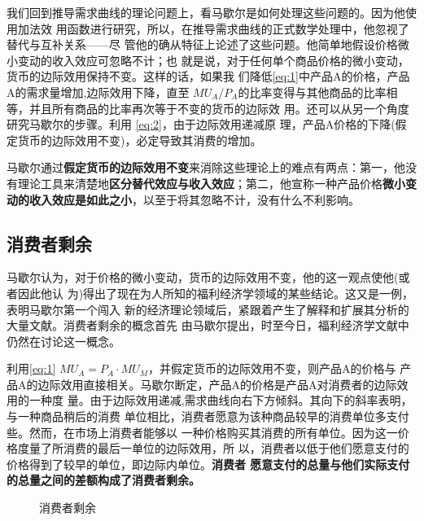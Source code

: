 我们回到推导需求曲线的理论问题上，看马歇尔是如何处理这些问题的。因为他使用加法效
用函数进行研究，所以，在推导需求曲线的正式数学处理中，他忽视了替代与互补关系——尽
管他的确从特征上论述了这些问题。他简单地假设价格微小变动的收入效应可忽略不计；也
就是说，对于任何单个商品价格的微小变动，货币的边际效用保持不变。这样的话，如果我
们降低\cref{eq:1}中产品A的价格，产品A的需求量增加,边际效用下降，直至 $MU_A /
P_A$的比率变得与其他商品的比率相等，并且所有商品的比率再次等于不变的货币的边际效
用。还可以从另一个角度研究马歇尔的步骤。利用 \cref{eq:2}，由于边际效用递减原
理，产品A价格的下降(假定货币的边际效用不变)，必定导致其消费的增加。

马歇尔通过\textbf{假定货币的边际效用不变}来消除这些理论上的难点有两点：第一，他没
有理论工具来清楚地\textbf{区分替代效应与收入效应}；第二，他宣称一种产品价格\textbf{微小变
动的收入效应是如此之小}，以至于将其忽略不计，没有什么不利影响。

\subsection{消费者剩余}

马歇尔认为，对于价格的微小变动，货币的边际效用不变，他的这一观点使他(或者因此他认
为)得出了现在为人所知的福利经济学领域的某些结论。这又是一例，表明马歇尔第一个闯入
新的经济理论领域后，紧跟着产生了解释和扩展其分析的大量文献。消费者剩余的概念首先
由马歇尔提出，时至今日，福利经济学文献中仍然在讨论这一概念。

利用\cref{eq:1} $MU_A=P_A \cdot MU_M$，并假定货币的边际效用不变，则产品A的价格与
产品A的边际效用直接相关。马歇尔断定，产品A的价格是产品A对消费者的边际效用的一种度
量。由于边际效用递减,需求曲线向右下方倾斜。其向下的斜率表明，与一种商品稍后的消费
单位相比，消费者愿意为该种商品较早的消费单位多支付些。然而，在市场上消费者能够以
一种价格购买其消费的所有单位。因为这一价格度量了所消费的最后一单位的边际效用，所
以，消费者以低于他们愿意支付的价格得到了较早的单位，即边际内单位。\textbf{消费者
  愿意支付的总量与他们实际支付的总量之间的差额构成了消费者剩余。}
\begin{figure}[ht]
  \centering
  \caption{\label{fig:conssurplus}消费者剩余}
\end{figure}

